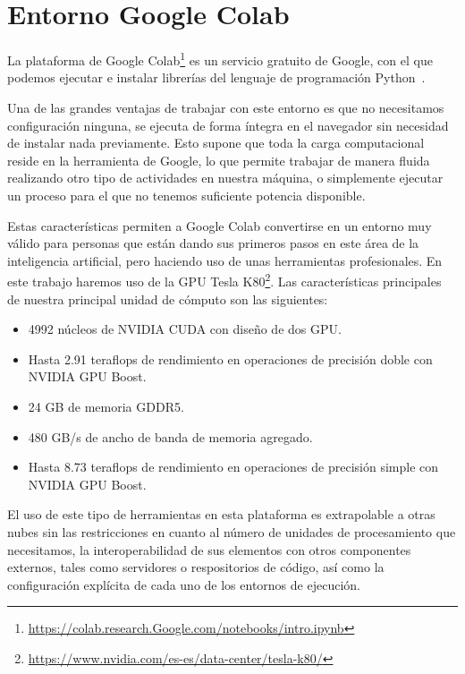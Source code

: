 \section{Entorno Google Colab}\label{sec:entorno-Google-colab}
La plataforma de Google Colab\footnote{\url{https://colab.research.Google.com/notebooks/intro.ipynb}} es un servicio gratuito de Google, con el que podemos ejecutar e instalar librerías del lenguaje de programación Python~\cite{python_object_oriented}.

Una de las grandes ventajas de trabajar con este entorno es que no necesitamos configuración ninguna, se ejecuta de forma íntegra en el navegador sin necesidad de instalar nada previamente. Esto supone que toda la carga computacional reside en la herramienta de Google, lo que permite trabajar de manera fluida realizando otro tipo de actividades en nuestra máquina, o simplemente ejecutar un proceso para el que no tenemos suficiente potencia disponible.


Estas características permiten a Google Colab convertirse en un entorno muy válido para personas que están dando sus primeros pasos en este área de la inteligencia artificial, pero haciendo uso
de unas herramientas profesionales.
En este trabajo haremos uso de la GPU Tesla K80\footnote{\url{https://www.nvidia.com/es-es/data-center/tesla-k80/}}.
Las características principales de nuestra principal unidad de cómputo son las siguientes:
\begin{itemize}
    \item 4992 núcleos de NVIDIA CUDA con diseño de dos GPU\@.
    \item Hasta 2.91 teraflops de rendimiento en operaciones de precisión doble con NVIDIA GPU Boost.
    \item 24 GB de memoria GDDR5.
    \item 480 GB/s de ancho de banda de memoria agregado.
    \item Hasta 8.73 teraflops de rendimiento en operaciones de precisión simple con NVIDIA GPU Boost.
\end{itemize}

El uso de este tipo de herramientas en esta plataforma es extrapolable a otras nubes sin las restricciones en cuanto al número de unidades de procesamiento que necesitamos, la interoperabilidad de sus elementos con otros componentes externos, tales como servidores o respositorios de código, así como la configuración explícita de cada uno de los entornos de ejecución.

